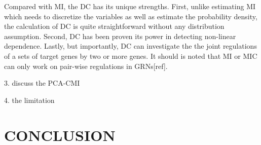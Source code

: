 \documentclass{bioinfo}
\begin{document}
Compared with MI, the DC has its unique strengths. First, unlike estimating MI which needs to discretize the variables as well as estimate the probability density, the calculation of DC is quite straightforward without any distribution assumption. Second, DC has been proven its power in detecting non-linear dependence. Lastly, but importantly, DC can investigate the the joint regulations of a sets of target genes by two or more genes. It should is noted that MI or MIC can only work on pair-wise regulations in GRNs[ref].

3. discuss the PCA-CMI

4. the limitation


\section{CONCLUSION}


%
%
%
%
%
%


\end{document}
